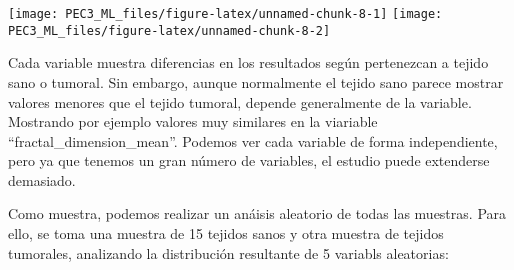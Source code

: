 \documentclass[
]{article}
\newenvironment{Shaded}{\begin{snugshade}}{\end{snugshade}}
\newcommand{\DataTypeTok}[1]{\textcolor[rgb]{0.13,0.29,0.53}{#1}}
\newcommand{\DecValTok}[1]{\textcolor[rgb]{0.00,0.00,0.81}{#1}}
\newcommand{\FloatTok}[1]{\textcolor[rgb]{0.00,0.00,0.81}{#1}}
\newcommand{\KeywordTok}[1]{\textcolor[rgb]{0.13,0.29,0.53}{\textbf{#1}}}
\newcommand{\NormalTok}[1]{#1}
\newcommand{\OperatorTok}[1]{\textcolor[rgb]{0.81,0.36,0.00}{\textbf{#1}}}
\newcommand{\StringTok}[1]{\textcolor[rgb]{0.31,0.60,0.02}{#1}}
\begin{document}
\begin{Shaded}
\end{Shaded}

\begin{center}\texttt{[image: PEC3\_ML\_files/figure-latex/unnamed-chunk-8-1]} \texttt{[image: PEC3\_ML\_files/figure-latex/unnamed-chunk-8-2]} \end{center}

Cada variable muestra diferencias en los resultados según pertenezcan a
tejido sano o tumoral. Sin embargo, aunque normalmente el tejido sano
parece mostrar valores menores que el tejido tumoral, depende
generalmente de la variable. Mostrando por ejemplo valores muy similares
en la viariable ``fractal\_dimension\_mean''. Podemos ver cada variable
de forma independiente, pero ya que tenemos un gran número de variables,
el estudio puede extenderse demasiado.

Como muestra, podemos realizar un anáisis aleatorio de todas las
muestras. Para ello, se toma una muestra de 15 tejidos sanos y otra
muestra de tejidos tumorales, analizando la distribución resultante de 5
variabls aleatorias:
\end{document}

